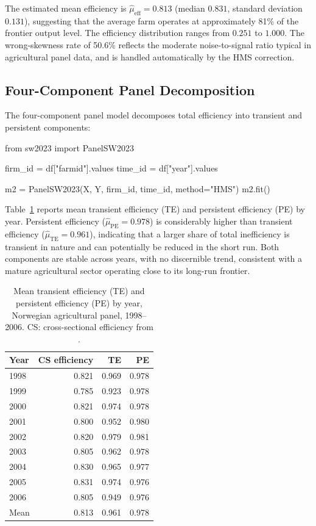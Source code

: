 \documentclass[article]{jss}
\begin{document}
The estimated mean efficiency is $\hat\mu_{\mathrm{eff}} = 0.813$
(median $0.831$, standard deviation $0.131$), suggesting that the average
farm operates at approximately 81\% of the frontier output level.
The efficiency distribution ranges from $0.251$ to $1.000$.
The wrong-skewness rate of 50.6\% reflects the moderate
noise-to-signal ratio typical in agricultural panel data, and is handled
automatically by the HMS correction.

\subsection[Four-component panel decomposition]{Four-Component Panel Decomposition}

The four-component panel model decomposes total efficiency into
transient and persistent components:

\begin{Code}
from sw2023 import PanelSW2023

firm_id = df["farmid"].values
time_id = df["year"].values

m2 = PanelSW2023(X, Y, firm_id, time_id, method="HMS")
m2.fit()
\end{Code}

Table~\ref{tab:norway_yearly} reports mean transient efficiency (TE)
and persistent efficiency (PE) by year.
Persistent efficiency ($\hat\mu_{\mathrm{PE}} = 0.978$) is considerably
higher than transient efficiency ($\hat\mu_{\mathrm{TE}} = 0.961$),
indicating that a larger share of total inefficiency is transient in
nature and can potentially be reduced in the short run.
Both components are stable across years, with no discernible trend,
consistent with a mature agricultural sector operating close to its
long-run frontier.

\begin{table}[t]
\centering
\caption{Mean transient efficiency (TE) and persistent efficiency (PE)
by year, Norwegian agricultural panel, 1998--2006.
CS: cross-sectional efficiency from .}
\label{tab:norway_yearly}
\begin{tabular}{lrrr}
\hline
Year & CS efficiency & TE & PE \\
\hline
1998 & 0.821 & 0.969 & 0.978 \\
1999 & 0.785 & 0.923 & 0.978 \\
2000 & 0.821 & 0.974 & 0.978 \\
2001 & 0.800 & 0.952 & 0.980 \\
2002 & 0.820 & 0.979 & 0.981 \\
2003 & 0.805 & 0.962 & 0.978 \\
2004 & 0.830 & 0.965 & 0.977 \\
2005 & 0.831 & 0.974 & 0.976 \\
2006 & 0.805 & 0.949 & 0.976 \\
\hline
Mean & 0.813 & 0.961 & 0.978 \\
\hline
\end{tabular}
\end{table}
\end{document}
